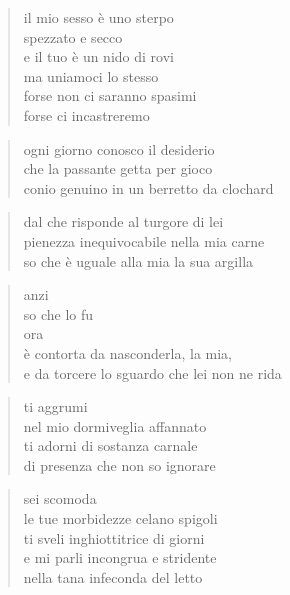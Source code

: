 \begin{poem}
	\begin{verse}
		il mio sesso è uno sterpo\\
		spezzato e secco\\
		e il tuo è un nido di rovi\\
		ma uniamoci lo stesso\\
		forse non ci saranno spasimi\\
		forse ci incastreremo
	\end{verse}

\clearpage


\begin{poem}
	\begin{verse}
		ogni giorno conosco il desiderio\\
		che la passante getta per gioco\\
		conio genuino in un berretto da clochard
	\end{verse}

	\begin{verse}
		dal che risponde al turgore di lei\\
		pienezza inequivocabile nella mia carne\\
		so che è uguale alla mia la sua argilla
	\end{verse}

	\begin{verse}
		anzi\\
		so che lo fu\\
		ora \\
		è contorta da nasconderla, la mia,\\
		e da torcere lo sguardo che lei non ne rida
	\end{verse}

\clearpage


	\begin{verse}
		ti aggrumi\\
		nel mio dormiveglia affannato\\
		ti adorni di sostanza carnale\\
		di presenza che non so ignorare
	\end{verse}

	\begin{verse}
		sei scomoda\\
		le tue morbidezze celano spigoli\\
		ti sveli inghiottitrice di giorni\\
		e mi parli incongrua e stridente\\
		nella tana infeconda del letto
	\end{verse}


\end{poem}
\end{poem}
